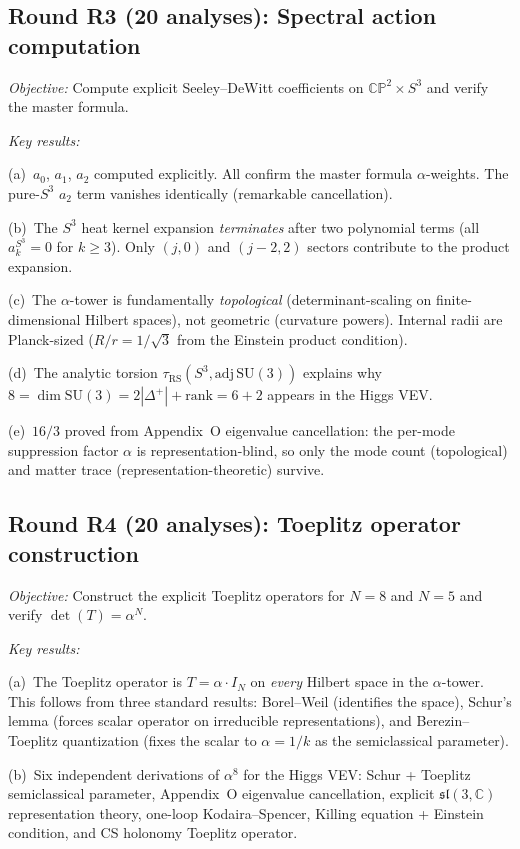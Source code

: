 \documentclass[aps,prd,twocolumn,superscriptaddress,nofootinbib]{revtex4-2}
\newcommand{\CP}{\mathbb{CP}}
\newcommand{\Sph}{S}
\begin{document}
\subsection{Round R3 (20 analyses): Spectral action
computation}

\emph{Objective:} Compute explicit Seeley--DeWitt
coefficients on $\CP^2\times\Sph^3$ and verify the
master formula.

\emph{Key results:}

(a)~$a_0$, $a_1$, $a_2$ computed explicitly. All confirm
the master formula $\alpha$-weights. The pure-$\Sph^3$
$a_2$ term vanishes identically (remarkable cancellation).

(b)~The $\Sph^3$ heat kernel expansion \emph{terminates}
after two polynomial terms (all $a_k^{\Sph^3} = 0$ for
$k\geq 3$). Only $(j,0)$ and $(j{-}2,2)$ sectors
contribute to the product expansion.

(c)~The $\alpha$-tower is fundamentally
\emph{topological} (determinant-scaling on
finite-dimensional Hilbert spaces), not geometric
(curvature powers). Internal radii are Planck-sized
($R/r = 1/\sqrt{3}$ from the Einstein product condition).

(d)~The analytic torsion $\tau_{\mathrm{RS}}(\Sph^3,
\mathrm{adj}\,\mathrm{SU}(3))$ explains why $8 = \dim
\mathrm{SU}(3) = 2|\Delta^+| + \mathrm{rank} = 6+2$
appears in the Higgs VEV.

(e)~$16/3$ proved from Appendix~O eigenvalue
cancellation: the per-mode suppression factor $\alpha$
is representation-blind, so only the mode count
(topological) and matter trace (representation-theoretic)
survive.

\subsection{Round R4 (20 analyses): Toeplitz operator
construction}

\emph{Objective:} Construct the explicit Toeplitz
operators for $N=8$ and $N=5$ and verify
$\det(T) = \alpha^N$.

\emph{Key results:}

(a)~The Toeplitz operator is
$T = \alpha\cdot I_N$ on \emph{every} Hilbert space
in the $\alpha$-tower. This follows from three standard
results: Borel--Weil (identifies the space),
Schur's lemma (forces scalar operator on irreducible
representations), and Berezin--Toeplitz quantization
(fixes the scalar to $\alpha = 1/k$ as the semiclassical
parameter).

(b)~Six independent derivations of $\alpha^8$ for the
Higgs VEV: Schur + Toeplitz semiclassical parameter,
Appendix~O eigenvalue cancellation, explicit
$\mathfrak{sl}(3,\mathbb{C})$ representation theory,
one-loop Kodaira--Spencer, Killing equation + Einstein
condition, and CS holonomy Toeplitz operator.
\end{document}

